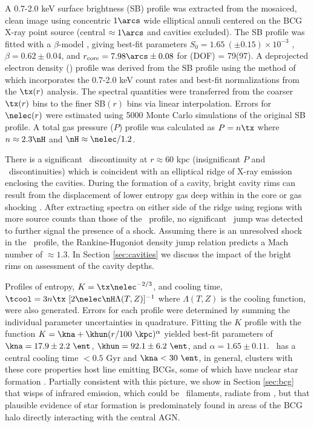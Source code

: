 \documentclass{emulateapj}
\begin{document}
A 0.7-2.0 keV surface brightness (SB) profile was extracted from the
mosaiced, clean image using concentric $1\arcs$ wide elliptical annuli
centered on the BCG X-ray point source (central $\approx 1\arcs$ and
cavities excluded). The SB profile was fitted with a $\beta$-model
\citep{betamodel}, giving best-fit parameters $S_0 = 1.65 ~(\pm 0.15)
\times 10^{-3}$ \sbr, $\beta = 0.62 \pm 0.04$, and $r_{\rm{core}} =
7.98\arcs \pm 0.08$ for \chisq(DOF) = 79(97). A deprojected electron
density (\nelec) profile was derived from the SB profile using the
method of \citet{kriss83} which incorporates the 0.7-2.0 keV count
rates and best-fit normalizations from the $\tx(r)$ analysis. The
spectral quantities were transferred from the coarser $\tx(r)$ bins to
the finer SB$(r)$ bins via linear interpolation. Errors for
$\nelec(r)$ were estimated using 5000 Monte Carlo simulations of the
original SB profile. A total gas pressure ($P$) profile was calculated
as $P = n \tx$ where $n \approx 2.3 \nH$ and $\nH \approx \nelec/1.2$.

There is a significant \nelec\ discontinuity at $r \approx 60$ kpc
(insignificant $P$ and \tx\ discontinuities) which is coincident with
an elliptical ridge of X-ray emission enclosing the cavities. During
the formation of a cavity, bright cavity rims can result from the
displacement of lower entropy gas deep within in the core
\citep[\eg][]{2009ApJ...697L..95B} or gas shocking
\citep[\eg][]{ms0735}. After extracting spectra on either side of the
ridge using regions with more source counts than those of the
\tx\ profile, no significant \tx\ jump was detected to further signal
the presence of a shock. Assuming there is an unresolved shock in the
\tx\ profile, the Rankine-Hugoniot density jump relation predicts a
Mach number of $\approx 1.3$. In Section \ref{sec:cavities} we discuss
the impact of the bright rims on assessment of the cavity depths.

Profiles of entropy, $K = \tx \nelec^{-2/3}$, and cooling time,
$\tcool = 3 n \tx~[2 \nelec \nH \Lambda(T,Z)]^{-1}$ where
$\Lambda(T,Z)$ is the cooling function, were also generated. Errors
for each profile were determined by summing the individual parameter
uncertainties in quadrature. Fitting the $K$ profile with the function
$K = \kna +\khun (r/100 ~\kpc)^{\alpha}$ \citep{accept} yielded
best-fit parameters of $\kna = 17.9 \pm 2.2 ~\ent$, $\khun = 92.1 \pm
6.2 ~\ent$, and $\alpha = 1.65 \pm 0.11$. \rxj\ has a central cooling
time $< 0.5$ Gyr and $\kna < 30 ~\ent$, in general, clusters with
these core properties host line emitting BCGs, some of which have
nuclear star formation \citep{crawford99, haradent,
  rafferty08}. Partially consistent with this picture, we show in
Section \ref{sec:bcg} that wisps of infrared emission, which could be
\halpha\ filaments, radiate from \rbs, but that plausible evidence of
star formation is predominately found in areas of the BCG halo
directly interacting with the central AGN.
\end{document}
